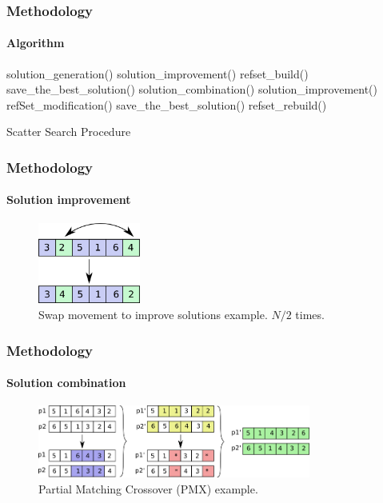 \begin{frame}[fragile]
    \frametitle{Methodology}
    \framesubtitle{Algorithm}

    \begin{algorithm}[H]
        \scriptsize
        \begin{algorithmic}
            \STATE solution\_generation()
            \STATE solution\_improvement()
            \STATE refset\_build()
            \STATE save\_the\_best\_solution()
            \REPEAT
                    \STATE solution\_combination()
                    \STATE solution\_improvement()
                    \STATE refSet\_modification()
                \ENDWHILE
                \STATE save\_the\_best\_solution()
                \STATE refset\_rebuild()
        \end{algorithmic}
        \caption{Scatter Search Procedure}
        \label{alg:1}
    \end{algorithm}

\end{frame}


\begin{frame}
    \frametitle{Methodology}
    \framesubtitle{Solution improvement}

        \begin{figure}[h!t]
            \centering
            \includegraphics[width=0.3\textwidth]{../report/img/ia-swap}
            \caption{Swap movement to improve solutions example. $N/2$ times.}
            \label{fig:swap}
        \end{figure}

\end{frame}

\begin{frame}
    \frametitle{Methodology}
    \framesubtitle{Solution combination}

        \begin{figure}[h!t]
            \centering
            \includegraphics[width=0.8\textwidth]{../report/img/ia-pmx}
            \caption{Partial Matching Crossover (PMX) example.}
            \label{fig:pmx}
        \end{figure}

\end{frame}


